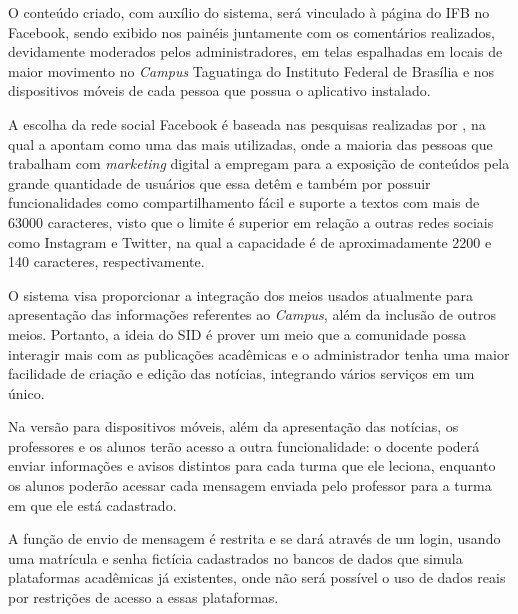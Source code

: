 O conteúdo criado, com auxílio do sistema, será vinculado à página do IFB no Facebook, sendo exibido nos painéis juntamente com os comentários realizados, devidamente moderados pelos administradores, em telas espalhadas em locais de maior movimento no \textit{Campus} Taguatinga do Instituto Federal de Brasília e nos dispositivos móveis de cada pessoa que possua o aplicativo instalado. 

A escolha da rede social Facebook é baseada nas pesquisas realizadas por \citet{muchardie2016}, na qual a apontam como uma das mais utilizadas, onde a maioria das pessoas que trabalham com \textit{marketing} digital a empregam para a exposição de conteúdos pela grande quantidade de usuários que essa detêm e também por possuir funcionalidades como compartilhamento fácil e suporte a textos com mais de 63000 caracteres, visto que o limite é superior em relação a outras redes sociais como Instagram e Twitter, na qual a capacidade é de aproximadamente 2200 e 140 caracteres, respectivamente.

O sistema visa proporcionar a integração dos meios usados atualmente para apresentação das informações referentes ao \textit{Campus}, além da inclusão de outros meios. Portanto, a ideia do SID é prover um meio que a comunidade possa interagir mais com as publicações acadêmicas e o administrador tenha uma maior facilidade de criação e edição das notícias, integrando vários serviços em um único.


Na versão para dispositivos móveis, além da apresentação das notícias, os professores e os alunos terão acesso a outra funcionalidade: o docente poderá enviar informações e avisos distintos para cada turma que ele leciona, enquanto os alunos poderão acessar cada mensagem enviada pelo professor para a turma em que ele está cadastrado.

A função de envio de mensagem é restrita e se dará através de um login, usando uma matrícula e senha fictícia cadastrados no bancos de dados que simula plataformas acadêmicas já existentes, onde não será possível o uso de dados reais por restrições de acesso a essas plataformas.


